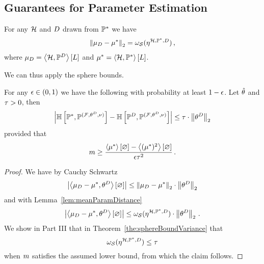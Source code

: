 \subsection{Guarantees for Parameter Estimation}



\begin{lemma}\label{lem:meanParamDistance}
	For any $\mathcal{H}$ and $D$ drawn from $\mathbb{P}^*$ we have
	\begin{align*}
		\left\|\mu_{D} - \mu^*\right\|_{2} 
		= \omega_{\mathcal{S}}(\eta^{\mathcal{H},\mathbb{P}^*,D}) \, ,
	\end{align*}
	where $\mu_{D}=\left\langle \mathcal{H},\mathbb{P}^{D}\right\rangle \left[ L \right]$ and $\mu^*=\left\langle \mathcal{H},\mathbb{P}^*\right\rangle \left[ L \right]$.
\end{lemma}

%
We can thus apply the sphere bounds.


\begin{theorem}
	For any $\epsilon\in(0,1)$ we have the following with probability at least $1-\epsilon$.
	Let $\hat{\theta}$ and $\tau>0$, then
		\[ \left|\mathbb{H}\left[\mathbb{P}^*,\mathbb{P}^{(\mathcal{F},\theta^{D},\nu)}\right] - \mathbb{H}\left[\mathbb{P}^{D},\mathbb{P}^{(\mathcal{F},\theta^{D},\nu)}\right]\right| \leq \tau \cdot \left\|\theta^{D}\right\|_{2} \]
	provided that
		\[ m \geq \frac{\left\langle \mu^*\right\rangle \left[ \varnothing \right]-\left\langle (\mu^*)^2\right\rangle \left[ \varnothing \right]}{\epsilon \tau^2} \, . \]
\end{theorem}
\begin{proof}
	We have by Cauchy Schwartz 
		\[ \left|\left\langle \mu_{D} - \mu^*,\theta^{D}\right\rangle \left[ \varnothing \right]\right| \leq \left\|\mu_{D} - \mu^*\right\|_{2} \cdot \left\|\theta^{D}\right\|_{2}\]
	and with Lemma~\ref{lem:meanParamDistance}
		\[ \left|\left\langle \mu_{D} - \mu^*,\theta^{D}\right\rangle \left[ \varnothing \right]\right| \leq \omega_{\mathcal{S}}(\eta^{\mathcal{H},\mathbb{P}^*,D}) \cdot \left\|\theta^{D}\right\|_{2} \, . \]
	We show in Part III that in Theorem~\ref{the:sphereBoundVariance} that
		\[  \omega_{\mathcal{S}}(\eta^{\mathcal{H},\mathbb{P}^*,D}) \leq \tau \]
	when $m$ satisfies the assumed lower bound, from which the claim follows.
\end{proof}






